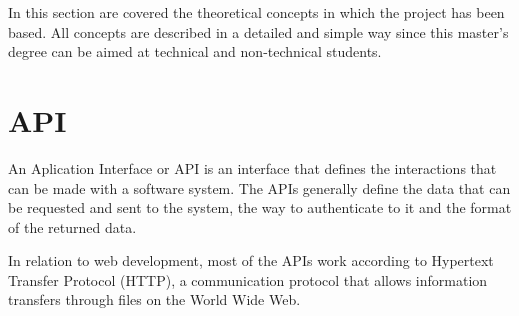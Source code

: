 

\nonzeroparskip In this section are covered the theoretical concepts in which the project has been based. All concepts are described in a detailed and simple way since this master's degree can be aimed at technical and non-technical students.

\section{API}

\nonzeroparskip An Aplication Interface or API is an interface that defines the interactions that can be made with a software system. The APIs generally define the data that can be requested and sent to the system, the way to authenticate to it and the format of the returned data.

\nonzeroparskip In relation to web development, most of the APIs work according to Hypertext Transfer Protocol (HTTP), a communication protocol that allows information transfers through files on the World Wide Web.


